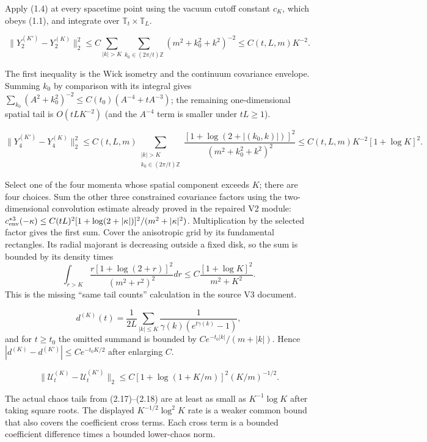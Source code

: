 \documentclass[11pt,a4paper]{article}
\newcommand{\T}{\mathbb T}
\newcommand{\Z}{\mathbb Z}
\newcommand{\U}{\mathcal U}
\begin{document}
\Because Apply (1.4) at every spacetime point using the vacuum cutoff constant
$c_K$, which obeys (1.1), and integrate over $\T_t\times\T_L$.

\[
 \|Y_2^{(K')}-Y_2^{(K)}\|_2^2
 \le C\sum_{|k|>K}\sum_{k_0\in(2\pi/t)\Z}
 (m^2+k_0^2+k^2)^{-2}\le C(t,L,m)K^{-2}.
\tag{2.17}
\]

\Because The first inequality is the Wick isometry and the continuum covariance
envelope.  Summing $k_0$ by comparison with its integral gives
$\sum_{k_0}(A^2+k_0^2)^{-2}\le C(t_0)(A^{-4}+tA^{-3})$; the remaining
one-dimensional spatial tail is $O(tLK^{-2})$ (and the $A^{-4}$ term is
smaller under $tL\ge1$).

\[
 \|Y_4^{(K')}-Y_4^{(K)}\|_2^2
 \le C(t,L,m)
 \sum_{\substack{|k|>K\\ k_0\in(2\pi/t)\Z}}
 \frac{[1+\log(2+|(k_0,k)|)]^2}
 {(m^2+k_0^2+k^2)^2}
 \le C(t,L,m)K^{-2}[1+\log K]^2.
\tag{2.18}
\]

\Because Select one of the four momenta whose spatial component exceeds $K$;
there are four choices.  Sum the other three constrained covariance factors using
the two-dimensional convolution estimate already proved in the repaired V2 module:
$c_{\rm env}^{*3}(-\kappa)\le C(tL)^2[1+\log(2+|\kappa|)]^2/
(m^2+|\kappa|^2)$.  Multiplication by the selected factor gives the first sum.
Cover the anisotropic grid by its fundamental rectangles.  Its radial majorant is
decreasing outside a fixed disk, so the sum is bounded by its density times
\[
 \int_{r>K}\frac{r[1+\log(2+r)]^2}{(m^2+r^2)^2}dr
 \le C\frac{[1+\log K]^2}{m^2+K^2}.
\]
This is the missing ``same tail counts'' calculation in the source V3 document.


\Because
\[
 d^{(K)}(t)=\frac1{2L}\sum_{|k|\le K}
 \frac1{\gamma(k)(e^{t\gamma(k)}-1)},
\]
and for $t\ge t_0$ the omitted summand is bounded by
$C e^{-t_0|k|}/(m+|k|)$.  Hence
$|d^{(K)}-d^{(K')}|\le Ce^{-t_0K/2}$ after enlarging $C$.

\[
 \|\U_t^{(K)}-\U_t^{(K')}\|_2
 \le C[1+\log(1+K/m)]^2(K/m)^{-1/2}.
\tag{2.19}
\]

\Because The actual chaos tails from (2.17)--(2.18) are at least as small as
$K^{-1}\log K$ after taking square roots.  The displayed $K^{-1/2}\log^2K$
rate is a weaker common bound that also covers the coefficient cross terms.  Each
cross term is a bounded coefficient difference times a bounded lower-chaos norm.
\end{document}
